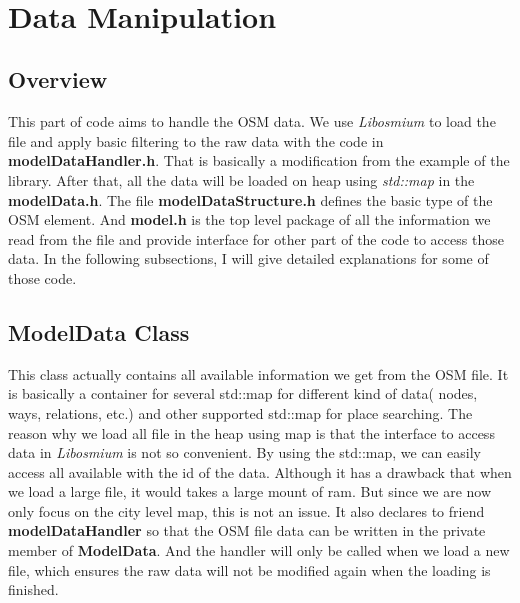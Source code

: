\documentclass[a4paper, 12pt, english]{book}
\begin{document}
\\
\section{Data Manipulation}
\subsection{Overview}
This part of code aims to handle the OSM data. We use {\textit{Libosmium}} {\cite{Libosmium}} to load the file and apply basic filtering to the raw data with the code in {\textbf{modelDataHandler.h}}. That is basically a modification from the example of the library. After that, all the data will be loaded on heap using {\textit{std::map}} in the {\textbf{modelData.h}}. The file {\textbf{modelDataStructure.h}} defines the basic type of the OSM element. And {\textbf{model.h}} is the top level package of all the information we read from the file and provide interface for other part of the code to access those data. In the following subsections, I will give detailed explanations for some of those code.

\subsection{ModelData Class}

This class actually contains all available information we get from the OSM file. It is basically a container for several std::map for different kind of data( nodes, ways, relations, etc.) and other supported std::map for place searching. The reason why we load all file in the heap using map is that the interface to access data in {\textit{Libosmium}} is not so convenient. By using the std::map, we can easily access all available with the id of the data. Although it has a drawback that when we load a large file, it would takes a large mount of ram. But since we are now only focus on the city level map, this is not an issue. It also declares to friend {\textbf{modelDataHandler}} so that the OSM file data can be written in the private member of {\textbf{ModelData}}. And the handler will only be called when we load a new file, which ensures the raw data will not be modified again when the loading is finished.
\end{document}
